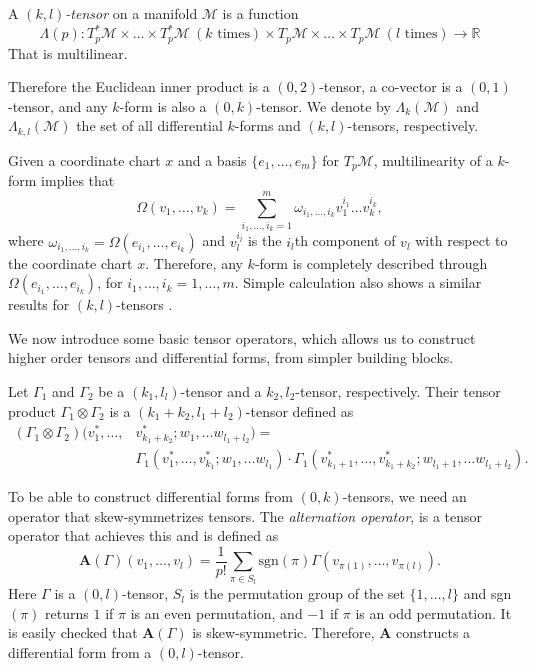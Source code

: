 \begin{definition}
A \emph{$(k,l)$-tensor} on a manifold $\mathcal M$ is a function 
\[
	\Lambda(p):T_p^*\mathcal M \times \dots \times T_p^*\mathcal M \ (k \text{ times}) \times T_p\mathcal M \times \dots \times T_p\mathcal M \ (l \text{ times}) \to \mathbb R
\]
That is multilinear.
\end{definition}
Therefore the Euclidean inner product is a $(0,2)$-tensor, a co-vector is a $(0,1)$-tensor, and any $k$-form is also a $(0,k)$-tensor. We denote by $\Lambda_{k}(\mathcal M)$ and $\Lambda_{k,l}(\mathcal M)$ the set of all differential $k$-forms and $(k,l)$-tensors, respectively.

Given a coordinate chart $x$ and a basis $\{ e_1,\dots,e_m\}$ for $T_{p}\mathcal M$, multilinearity of a $k$-form implies that
\begin{equation} \label{eq:2.6}
	\Omega(v_1,\dots,v_k) = \sum_{i_1,\dots,i_k =1}^{m} \omega_{i_1,\dots,i_k} v_{1}^{i_1}\dots v_{k}^{i_k}, 
\end{equation}
where $\omega_{i_1,\dots,i_k} = \Omega(e_{i_1},\dots,e_{i_k})$ and $v_{l}^{i_l}$ is the $i_l$th component of $v_l$ with respect to the coordinate chart $x$. Therefore, any $k$-form is completely described through $\Omega(e_{i_1},\dots,e_{i_k})$, for $i_1,\dots,i_k=1,\dots,m$. Simple calculation also shows a similar results for $(k,l)$-tensors \cite{Wald:106274}.

We now introduce some basic tensor operators, which allows us to construct higher order tensors and differential forms, from simpler building blocks.
\begin{definition}
	Let $\Gamma_1$ and $\Gamma_2$ be a $(k_1,l_l)$-tensor and a $k_2,l_2$-tensor, respectively. Their tensor product $\Gamma_1\otimes \Gamma_2$ is a $(k_1+k_2,l_1+l_2)$-tensor defined as
\[
	\begin{aligned}
	(\Gamma_1\otimes \Gamma_2)(v^*_1,\dots,&v^*_{k_1+k_2};w_1,\dots w_{l_1+l_2}) = \\
		&\Gamma_1(v^*_1,\dots,v^*_{k_1};w_1,\dots w_{l_1})\cdot \Gamma_1(v^*_{k_1+1},\dots,v^*_{k_1+k_2};w_{l_1+1},\dots w_{l_1+l_2}).
	\end{aligned}
\]
\end{definition}
To be able to construct differential forms from $(0,k)$-tensors, we need an operator that skew-symmetrizes tensors. The \emph{alternation operator}, is a tensor operator that achieves this and is defined as
\begin{equation} \label{eq:2.7}
	\textbf{A}(\Gamma)(v_1,\dots,v_l) = \frac{1}{p!} \sum_{\pi \in S_l} \text{sgn}(\pi) \Gamma(v_{\pi(1)},\dots,v_{\pi(l)}).
\end{equation}
Here $\Gamma$ is a $(0,l)$-tensor, $S_l$ is the permutation group of the set $\{1,\dots,l\}$ and sgn$(\pi)$ returns $1$ if $\pi$ is an even permutation, and $-1$ if $\pi$ is an odd permutation. It is easily checked that $\textbf{A}(\Gamma)$ is skew-symmetric. Therefore, $\textbf{A}$ constructs a differential form from a $(0,l)$-tensor.

